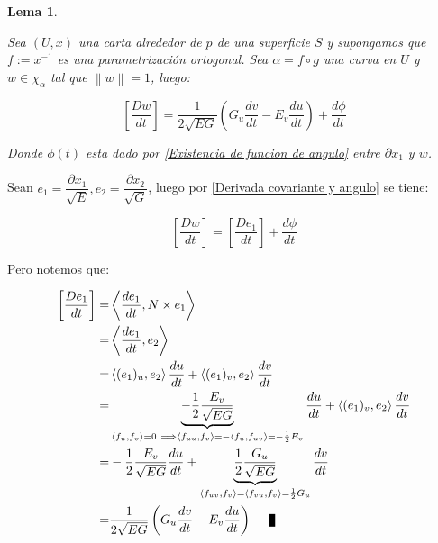 \documentclass[11pt]{article}
\newcommand\norm[1]{\left\lVert#1\right\rVert}
\newcommand\ip[1]{\left\langle#1\right\rangle}
\newtheorem{lemma}[theorem]{Lema}
\newenvironment{proof}[1][Demostraci\'on]{\begin{trivlist}
		\item[\hskip \labelsep {\bfseries #1}]}{\end{trivlist}}
\newcommand{\qed}{\nobreak \ifvmode \relax \else
	\ifdim\lastskip<1.5em \hskip-\lastskip
	\hskip1.5em plus0em minus0.5em \fi \nobreak
	\vrule height0.75em width0.5em depth0.25em\fi}
\begin{document}
\begin{lemma}
	\label{Valor de la derivada covariante en funcion de tensor fund}
	
	Sea $(U,x)$ una carta alrededor de $p$ de una superficie $S$ y supongamos que $f := x^{-1}$ es una parametrizaci\'on ortogonal. Sea $\alpha = f \circ g$ una curva en $U$ y $w \in \chi_{\alpha}$ tal que $\norm{w} = 1$, luego:
	
	\[
		\left[\dfrac{Dw}{dt}\right] = \dfrac{1}{2 \sqrt{EG}} \left(G_u \dfrac{dv}{dt} - E_v \dfrac{du}{dt}\right) + \dfrac{d \phi}{dt}
	\]
	
	Donde $\phi(t)$ esta dado por \ref{Existencia de funcion de angulo} entre $\partial x_{1}$ y $w$.
	
\end{lemma}

\begin{proof}
	
	Sean $e_1 = \dfrac{\partial x_1}{\sqrt{E}}, e_2 = \dfrac{\partial x_2}{\sqrt{G}}$, luego por \ref{Derivada covariante y angulo} se tiene:
	
	\begin{equation*}
		\left[\dfrac{Dw}{dt}\right] = \left[\dfrac{De_1}{dt}\right] + \dfrac{d \phi}{dt}
	\end{equation*}
	
	Pero notemos que:
	
	\begin{equation*}
	\begin{aligned}
		\left[\dfrac{De_1}{dt}\right] = & \ip{\dfrac{de_1}{dt}, N \times e_1} \\
		= & \ip{\dfrac{de_1}{dt}, e_2} \\
		= & \ip{(e_1)_u, e_2} \dfrac{du}{dt} + \ip{(e_1)_v, e_2} \dfrac{dv}{dt} \\
		= & \underbrace{- \frac{1}{2} \dfrac{E_v}{\sqrt{EG}}}_{{\ip{f_u,f_v} = 0 \ \Longrightarrow \ip{f_{uu} , f_v} = -  \ip{f_u,f_{uv}} = - \frac{1}{2}E_v}} \dfrac{du}{dt} + \ip{(e_1)_v, e_2} \dfrac{dv}{dt}	\\
		= & - \frac{1}{2} \dfrac{E_v}{\sqrt{EG}}\dfrac{du}{dt} + \underbrace{\frac{1}{2} \dfrac{G_u}{\sqrt{EG}}}_{{\ip{f_{uv},f_v} = \ip{f_{vu},f_v} = \frac{1}{2}G_u}} \dfrac{dv}{dt}	\\
		= & \dfrac{1}{2 \sqrt{EG}} \left(G_u \dfrac{dv}{dt} - E_v \dfrac{du}{dt}\right)  \qed	
	\end{aligned}
	\end{equation*}
	

\end{proof}
\end{document}
